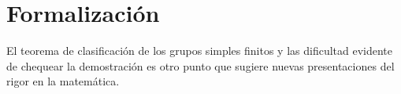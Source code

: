 







\section*{Formalización}

El teorema de clasificación de los grupos simples finitos y las dificultad
evidente de chequear la demostración es otro punto que sugiere nuevas presentaciones
del rigor en la matemática. 

